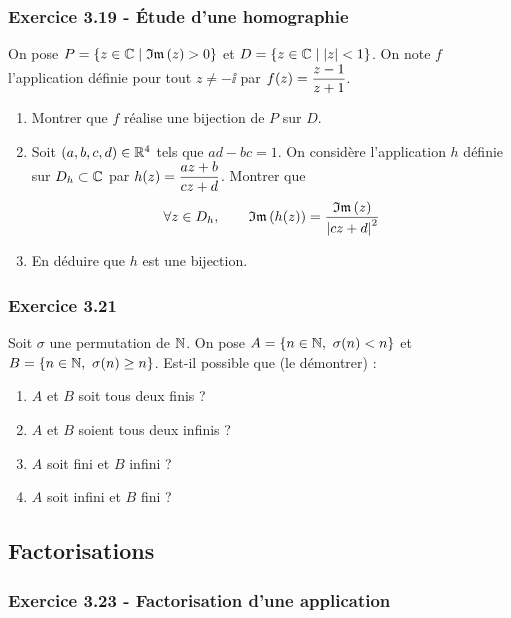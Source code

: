 \documentclass[a4paper,french,bookmarks]{article}
\begin{document}
    \subsubsection*{Exercice 3.19 - Étude d'une homographie}

    On pose $P = \ens{z \in \bdC \enstq \Im{z} > 0}$ et $D = \left\{z \in \mathbb{C} \;\middle\vert\; \left\lvert z\right\rvert  < 1\right\}$. On note $f$ l'application définie pour tout $z \neq -\ii $ par $f\!\left(z\right) = \dfrac{z - 1}{z + 1}$.

    \begin{enumerate}
        \item Montrer que $f$ réalise une bijection de $P$ sur $D$.

        \item Soit $\left(a, b, c, d\right) \in \mathbb{R}^4$ tels que $ad - bc = 1$. On considère l'application $h$ définie sur $D_h \subset \mathbb{C}$ par $h\!\left(z\right) = \dfrac{az + b}{cz + d}$. Montrer que
        \[ \forall z \in D_h,\qquad \Im{h\p{z}} = \dfrac{\Im{z}}{\mod{cz + d}^2}\]

        \item En déduire que $h$ est une bijection.
    \end{enumerate}

    \subsubsection*{Exercice 3.21}

    Soit $\sigma$ une permutation de $\mathbb{N}$. On pose $A = \left\{n \in \mathbb{N},\ \sigma\!\left(n\right) < n\right\}$ et $B = \ens{n \in \bdN,\ \sigma\p{n} \geq n}$. Est-il possible que (le démontrer) :
    \begin{enumerate}
        \item $A$ et $B$ soit tous deux finis ?
        \item $A$ et $B$ soient tous deux infinis ?

        \item $A$ soit fini et $B$ infini ?

        \item $A$ soit infini et $B$ fini ?
    \end{enumerate}

    \subsection{Factorisations}

    \subsubsection*{Exercice 3.23 - Factorisation d'une application}
\end{document}
